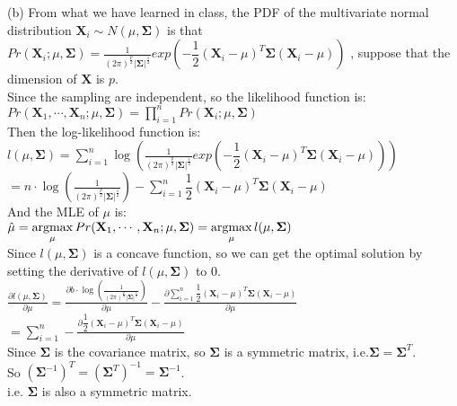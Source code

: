 \documentclass[10pt]{article}
\begin{document}
\begin{enumerate}[1.]
(b) From what we have learned in class, the PDF of the multivariate normal distribution
$\mathbf{X}_i\sim N(\mu, \mathbf{\Sigma})$ is that $Pr(\mathbf{X}_i;\mu,\mathbf{\Sigma})=\frac{1}{(2\pi)^\frac{p}{2}|\mathbf{\Sigma}|^{\frac{1}{2}}}exp(-\dfrac{1}{2}(\mathbf{X}_i-\mu)^T\mathbf{\Sigma}(\mathbf{X}_i-\mu))$
, suppose that the dimension of $\mathbf{X}$ is $p$.\\
Since the sampling are independent, so the likelihood function is:\\
$Pr(\mathbf{X}_1,\cdots,\mathbf{X}_n;\mu,\mathbf{\Sigma})=\prod\limits_{i=1}^nPr(\mathbf{X}_i;\mu,\mathbf{\Sigma})$\\
Then the log-likelihood function is:\\
$l(\mu,\mathbf{\Sigma})=\sum\limits_{i=1}^n\log(\frac{1}{(2\pi)^\frac{p}{2}|\mathbf{\Sigma}|^{\frac{1}{2}}}exp(-\dfrac{1}{2}(\mathbf{X}_i-\mu)^T\mathbf{\Sigma}(\mathbf{X}_i-\mu)))$\\
$=n\cdot\log(\frac{1}{(2\pi)^\frac{p}{2}|\mathbf{\Sigma}|^{\frac{1}{2}}})-\sum\limits_{i=1}^n\dfrac{1}{2}(\mathbf{X}_i-\mu)^T\mathbf{\Sigma}(\mathbf{X}_i-\mu)$\\

And the MLE of $\mu$ is:\\
$\hat{\mu}=\mathop{\rm argmax}\limits_{\mu}Pr(\mathbf{X}_1,\cdots,\mathbf{X}_n;\mu,\mathbf{\Sigma})=\mathop{\rm argmax}\limits_{\mu}l(\mu,\mathbf{\Sigma})$\\
Since $l(\mu,\mathbf{\Sigma})$ is a concave function, so we can get the optimal solution by setting the derivative of $l(\mu,\mathbf{\Sigma})$ to 0.\\
$\frac{\partial l(\mu,\mathbf{\Sigma})}{\partial \mu}=\frac{\partial b\cdot\log(\frac{1}{(2\pi)^\frac{p}{2}|\mathbf{\Sigma}|^{\frac{1}{2}}})}{\partial \mu}-\frac{\partial \sum\limits_{i=1}^n\dfrac{1}{2}(\mathbf{X}_i-\mu)^T\mathbf{\Sigma}(\mathbf{X}_i-\mu)}{\partial \mu}$\\
$=\sum\limits_{i=1}^n-\frac{\partial \dfrac{1}{2}(\mathbf{X}_i-\mu)^T\mathbf{\Sigma}(\mathbf{X}_i-\mu)}{\partial \mu}$\\

Since $\mathbf{\Sigma}$ is the covariance matrix, so $\mathbf{\Sigma}$ is a symmetric matrix, i.e.$\mathbf{\Sigma}=\mathbf{\Sigma}^T$.\\
So $(\mathbf{\Sigma}^{-1})^T=(\mathbf{\Sigma}^T)^{-1}=\mathbf{\Sigma}^{-1}$.\\
i.e. $\mathbf{\Sigma}$ is also a symmetric matrix.\\


\end{enumerate}
\end{document}
